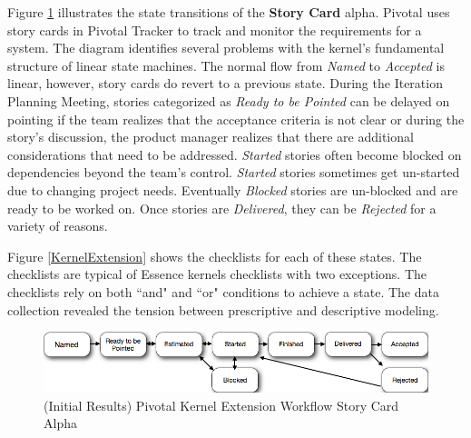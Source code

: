 \documentclass[preprint,12pt,3p]{elsarticle}
\begin{document}
Figure \ref{KernelExtensionWorkflow} illustrates the state transitions of the \textbf{Story Card} alpha. Pivotal uses story cards in Pivotal Tracker to track and monitor the requirements for a system. The diagram identifies several problems with the kernel's fundamental structure of linear state machines. The normal flow from \textit{Named} to \textit{Accepted} is linear, however, story cards do revert to a previous state. During the Iteration Planning Meeting, stories categorized as \textit{Ready to be Pointed} can be delayed on pointing if the team realizes that the acceptance criteria is not clear or during the story's discussion, the product manager realizes that there are additional considerations that need to be addressed. \textit{Started} stories often become blocked on dependencies beyond the team's control. \textit{Started} stories sometimes get un-started due to changing project needs. Eventually \textit{Blocked} stories are un-blocked and are ready to be worked on. Once stories are \textit{Delivered}, they can be \textit{Rejected} for a variety of reasons.

Figure \ref{KernelExtension} shows the checklists for each of these states. The checklists are typical of Essence kernels checklists with two exceptions. The checklists rely on both ``and" and  ``or" conditions to achieve a state. The data collection revealed the tension between prescriptive and descriptive modeling.

\begin{figure}[ht]
\includegraphics[width=6.25in]{pivotal_images/story_card_workflow}
\caption{(Initial Results) Pivotal Kernel Extension Workflow Story Card Alpha}
\label{KernelExtensionWorkflow}
\end{figure}
\end{document}
